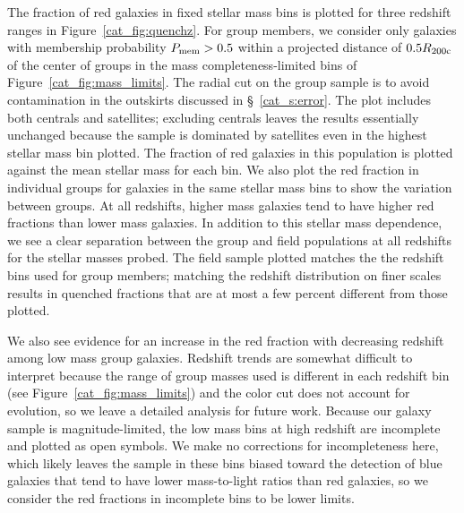 The fraction of red galaxies in fixed stellar mass bins is plotted
for three redshift ranges in Figure~\ref{cat_fig:quenchz}. For group
members, we consider only galaxies with membership probability $P_{\rm
mem}>0.5$ within a projected distance of $0.5\mbox{$R_{200\rm{c}}$}$ of the center of
groups in the mass completeness-limited bins of
Figure~\ref{cat_fig:mass_limits}. The radial cut on the group sample is to avoid contamination
in the outskirts discussed in \S~\ref{cat_s:error}. The plot includes both centrals and
satellites; excluding centrals leaves the results essentially
unchanged because the sample is dominated by satellites even in the
highest stellar mass bin plotted. The fraction of red galaxies in
this population is plotted against the mean stellar mass for each
bin. We also plot the red fraction in individual groups for galaxies
in the same stellar mass bins to show the
variation between groups. At all redshifts, higher mass galaxies tend
to have higher red fractions than lower mass galaxies. In addition to
this stellar mass dependence, we see a clear separation
between the group and field populations at all redshifts for the
stellar masses probed. The field sample plotted matches the
the redshift bins used for group members; matching the redshift
distribution on finer scales results in quenched fractions
that are at most a few percent different from those plotted.

We also see evidence for an increase in the red fraction with
decreasing redshift among low mass group galaxies. Redshift 
trends are somewhat difficult to interpret because the
range of group masses used is different in each redshift bin (see
Figure~\ref{cat_fig:mass_limits}) and the color cut does not account for
evolution, so we leave a detailed analysis for
future work. Because our galaxy sample is magnitude-limited,
the low mass bins at high redshift are incomplete and plotted as open
symbols. We make no corrections for incompleteness here, which likely
leaves the sample in these bins biased toward the detection of blue
galaxies that tend to have lower mass-to-light ratios than red galaxies,
so we consider the red fractions in incomplete bins to be lower limits.

